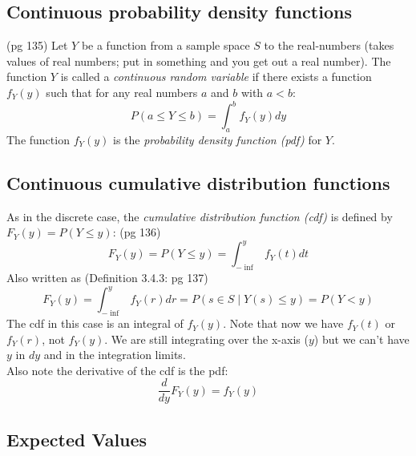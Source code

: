 \subsection{Continuous probability density functions}
{\tiny (pg 135)} Let $Y$ be a function from a sample space $S$ to the real-numbers (takes values of real numbers; put in something and you get out a real number).  The function $Y$ is called a \textit{continuous random variable} if there exists a function $f_Y(y)$ such that for any real numbers $a$ and $b$ with $a < b$:
	\[  P(a \leq Y \leq b) = \int_{a}^{b} f_Y(y)dy \]
The function $f_Y(y)$ is the \textit{probability density function (pdf)} for $Y$.  

\subsection{Continuous cumulative distribution functions}
As in the discrete case, the \textit{cumulative distribution function (cdf)} is defined by $F_Y(y) = P(Y \leq y)$: {\tiny (pg 136)}
	\[  F_Y(y) = P(Y \leq y) = \int_{- \inf}^{y} f_Y(t)dt \]
Also written as  {\tiny (Definition 3.4.3: pg 137)}
	\[  F_Y(y) = \int_{- \inf}^{y} f_Y(r)dr = P({s \in S \mid Y(s) \leq y}) = P(Y < y) \]
The cdf in this case is an integral of $f_Y(y)$.  Note that now we have $f_Y(t)$ or $f_Y(r)$, not $f_Y(y)$.  We are still integrating over the x-axis ($y$) but we can't have $y$ in $dy$ and in the integration limits.   \hfill \\  
Also note the derivative of the cdf is the pdf:
	\[  \frac{d}{dy}F_Y(y) = f_Y(y) \]
	
\subsection{Expected Values}







